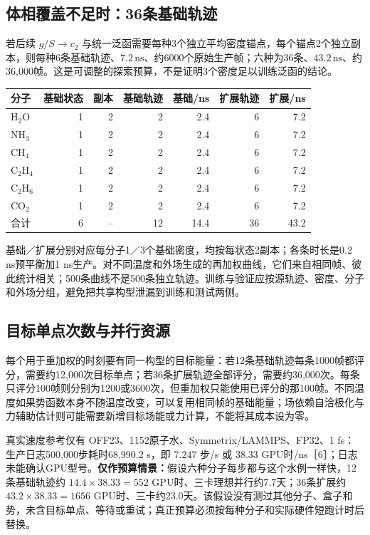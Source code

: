 \documentclass[11pt,a4paper]{article}
\begin{document}
\subsection{体相覆盖不足时：36条基础轨迹}
若后续 $g/S\to c_2$ 与统一泛函需要每种3个独立平均密度锚点，每个锚点2个独立副本，则每种6条基础轨迹、$7.2\,\mathrm{ns}$、约6000个原始生产帧；六种为36条、$43.2\,\mathrm{ns}$、约36,000帧。这是可调整的探索预算，不是证明3个密度足以训练泛函的结论。

\begin{center}\small\begin{tabular}{lrrrrrr}\toprule
分子 & 基础状态 & 副本 & 基础轨迹 & 基础/ns & 扩展轨迹 & 扩展/ns \\\midrule
H$_2$O &1&2&2&2.4&6&7.2\\
NH$_3$ &1&2&2&2.4&6&7.2\\
CH$_4$ &1&2&2&2.4&6&7.2\\
C$_2$H$_4$ &1&2&2&2.4&6&7.2\\
C$_2$H$_6$ &1&2&2&2.4&6&7.2\\
CO$_2$ &1&2&2&2.4&6&7.2\\\midrule
合计 &6&--&12&14.4&36&43.2\\\bottomrule\end{tabular}\end{center}

基础／扩展分别对应每分子1／3个基础密度，均按每状态2副本；各条时长是0.2 ns预平衡加1 ns生产。对不同温度和外场生成的再加权曲线，它们来自相同帧、彼此统计相关；500条曲线不是500条独立轨迹。训练与验证应按源轨迹、密度、分子和外场分组，避免把共享构型泄漏到训练和测试两侧。

\subsection{目标单点次数与并行资源}
每个用于重加权的时刻要有同一构型的目标能量：若12条基础轨迹每条1000帧都评分，需要约12,000次目标单点；若36条扩展轨迹全部评分，需要约36,000次。每条只评分100帧则分别为1200或3600次，但重加权只能使用已评分的那100帧。不同温度如果势函数本身不随温度改变，可以复用相同帧的基础能量；场依赖自洽极化与力辅助估计则可能需要新增目标场能或力计算，不能将其成本设为零。

真实速度参考仅有 OFF23、1152原子水、Symmetrix/LAMMPS、FP32、1 fs：生产日志500,000步耗时68,990.2 s，即 $7.247$ 步/s 或 $38.33$ GPU时/ns［6］；日志未能确认GPU型号。\textbf{仅作预算情景：}假设六种分子每步都与这个水例一样快，12条基础轨迹约 $14.4\times38.33=552$ GPU时、三卡理想并行约7.7天；36条扩展约 $43.2\times38.33=1656$ GPU时、三卡约23.0天。该假设没有测过其他分子、盒子和势，未含目标单点、等待或重试；真正预算必须按每种分子和实际硬件短跑计时后替换。
\end{document}
